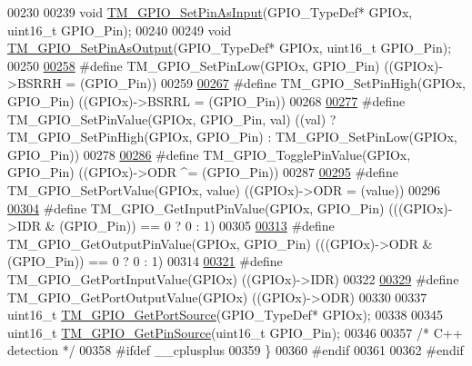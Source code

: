 \begin{DoxyCode}
00230 
00239 \textcolor{keywordtype}{void} \hyperlink{group___t_m___g_p_i_o___functions_ga9c5ca4f894b1f46d413d2bfc692fcf43}{TM\_GPIO\_SetPinAsInput}(GPIO\_TypeDef* GPIOx, uint16\_t GPIO\_Pin);
00240 
00249 \textcolor{keywordtype}{void} \hyperlink{group___t_m___g_p_i_o___functions_gabfa399cb17386714bd9c395a81b43035}{TM\_GPIO\_SetPinAsOutput}(GPIO\_TypeDef* GPIOx, uint16\_t GPIO\_Pin);
00250 
\hypertarget{tm__stm32f4__gpio_8h_source_l00258}{}\hyperlink{group___t_m___g_p_i_o___functions_gaccceda87ce348c73b43780fdfed048d3}{00258} \textcolor{preprocessor}{#define TM\_GPIO\_SetPinLow(GPIOx, GPIO\_Pin)          ((GPIOx)->BSRRH = (GPIO\_Pin))}
00259 
\hypertarget{tm__stm32f4__gpio_8h_source_l00267}{}\hyperlink{group___t_m___g_p_i_o___functions_gac5aa8fbc39ed67f47972097fb7c8d69d}{00267} \textcolor{preprocessor}{#define TM\_GPIO\_SetPinHigh(GPIOx, GPIO\_Pin)         ((GPIOx)->BSRRL = (GPIO\_Pin))}
00268 
\hypertarget{tm__stm32f4__gpio_8h_source_l00277}{}\hyperlink{group___t_m___g_p_i_o___functions_gaf0bc34b72794ca43246ef88cfd261e80}{00277} \textcolor{preprocessor}{#define TM\_GPIO\_SetPinValue(GPIOx, GPIO\_Pin, val)   ((val) ? TM\_GPIO\_SetPinHigh(GPIOx, GPIO\_Pin) :
       TM\_GPIO\_SetPinLow(GPIOx, GPIO\_Pin))}
00278 
\hypertarget{tm__stm32f4__gpio_8h_source_l00286}{}\hyperlink{group___t_m___g_p_i_o___functions_ga92ef176c8195c54b326b3c7526b878b2}{00286} \textcolor{preprocessor}{#define TM\_GPIO\_TogglePinValue(GPIOx, GPIO\_Pin)     ((GPIOx)->ODR ^= (GPIO\_Pin))}
00287 
\hypertarget{tm__stm32f4__gpio_8h_source_l00295}{}\hyperlink{group___t_m___g_p_i_o___functions_ga191a4bbb4e55573d19eb5c2f18122680}{00295} \textcolor{preprocessor}{#define TM\_GPIO\_SetPortValue(GPIOx, value)          ((GPIOx)->ODR = (value))}
00296 
\hypertarget{tm__stm32f4__gpio_8h_source_l00304}{}\hyperlink{group___t_m___g_p_i_o___functions_gacd91a02149d1f1bc648a3fe06648460d}{00304} \textcolor{preprocessor}{#define TM\_GPIO\_GetInputPinValue(GPIOx, GPIO\_Pin)   (((GPIOx)->IDR & (GPIO\_Pin)) == 0 ? 0 : 1)}
00305 
\hypertarget{tm__stm32f4__gpio_8h_source_l00313}{}\hyperlink{group___t_m___g_p_i_o___functions_ga6402ec4503fa0f3380d3bdbb1d9510db}{00313} \textcolor{preprocessor}{#define TM\_GPIO\_GetOutputPinValue(GPIOx, GPIO\_Pin)  (((GPIOx)->ODR & (GPIO\_Pin)) == 0 ? 0 : 1)}
00314 
\hypertarget{tm__stm32f4__gpio_8h_source_l00321}{}\hyperlink{group___t_m___g_p_i_o___functions_gabab8c885687b36adc083ae906f5d432e}{00321} \textcolor{preprocessor}{#define TM\_GPIO\_GetPortInputValue(GPIOx)            ((GPIOx)->IDR)}
00322 
\hypertarget{tm__stm32f4__gpio_8h_source_l00329}{}\hyperlink{group___t_m___g_p_i_o___functions_gaa84d8eae98478601cb845dfc13089769}{00329} \textcolor{preprocessor}{#define TM\_GPIO\_GetPortOutputValue(GPIOx)           ((GPIOx)->ODR)}
00330 
00337 uint16\_t \hyperlink{group___t_m___g_p_i_o___functions_gaa5a2f30f33cc19408daeb5db3b7cb59c}{TM\_GPIO\_GetPortSource}(GPIO\_TypeDef* GPIOx);
00338 
00345 uint16\_t \hyperlink{group___t_m___g_p_i_o___functions_ga29aaed3ba7054d4c3a3fed55012403e5}{TM\_GPIO\_GetPinSource}(uint16\_t GPIO\_Pin);
00346 
00357 \textcolor{comment}{/* C++ detection */}
00358 \textcolor{preprocessor}{#ifdef \_\_cplusplus}
00359 \}
00360 \textcolor{preprocessor}{#endif}
00361 
00362 \textcolor{preprocessor}{#endif}
\end{DoxyCode}
